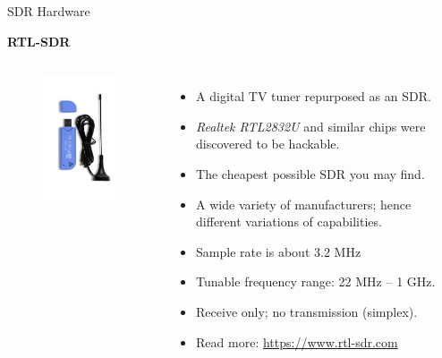 \documentclass[handout]{beamer}
\begin{document}
\begin{frame}{SDR Hardware}  

\footnotesize
\textbf{RTL-SDR}

\begin{columns}


	\begin{figure}
		\includegraphics[width=100pt]{figures/rtl-sdr.jpg}
	\end{figure}


	\begin{itemize}
	\footnotesize
	\item A digital TV tuner repurposed as an SDR.
		\vspace{5pt}
	\item \emph{Realtek RTL2832U} and similar chips were discovered to be hackable.
		\vspace{5pt}
	\item The cheapest possible SDR you may find.
		\vspace{5pt}
	\item A wide variety of manufacturers; hence different variations of capabilities.
		\vspace{5pt}
	\item Sample rate is about 3.2 MHz
		\vspace{5pt}
	\item Tunable frequency range: 22 MHz -- 1 GHz.
		\vspace{5pt}
	\item Receive only; no transmission (simplex).
		\vspace{5pt}
	\item Read more: \url{https://www.rtl-sdr.com}
	\end{itemize}


\end{columns}

\end{frame}
\end{document}
